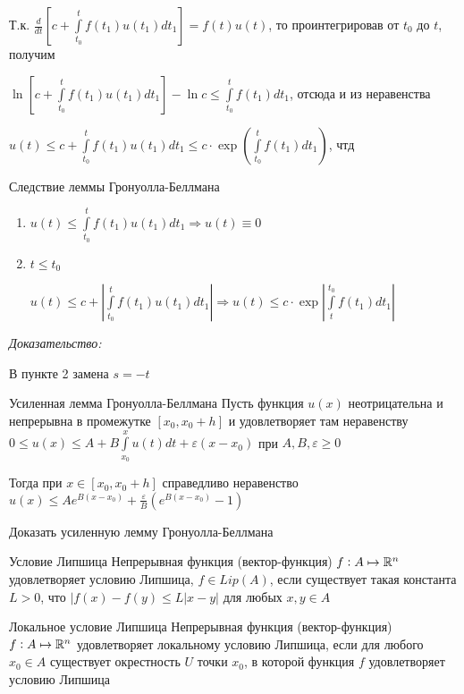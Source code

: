 \documentclass[12pt]{article}
\begin{document}
Т.к. $\frac{d}{dt}\left[ c + \int\limits_{t_0}^t f(t_1) u(t_1)dt_1 \right] = f(t)u(t)$, то проинтегрировав от $t_0$ до $t$, получим 

$\ln\left[ c + \int\limits_{t_0}^t f(t_1)u(t_1)dt_1 \right] - \ln c \leq \int\limits_{t_0}^t f(t_1)dt_1$, отсюда и из неравенства 

$u(t) \leq c + \int\limits_{t_0}^t f(t_1)u(t_1)dt_1 \leq c \cdot \exp(\int\limits_{t_0}^t f(t_1)dt_1)$, чтд

\begin{theo}{Следствие леммы Гронуолла-Беллмана}
    \begin{enumerate}
        \item $u(t) \leq \int\limits_{t_0}^t f(t_1)u(t_1)dt_1 \Rightarrow u(t) \equiv 0$
        \item $t \leq t_0$
        
        $u(t) \leq c + \left| \int\limits_{t_0}^t f(t_1)u(t_1)dt_1 \right| \Rightarrow u(t) \leq c \cdot \exp\left| \int\limits_t^{t_0} f(t_1)dt_1 \right|$
    \end{enumerate}
\end{theo}

\textit{Доказательство:}

В пункте 2 замена $s = -t$ 

\begin{lem}{Усиленная лемма Гронуолла-Беллмана}
    Пусть функция $u(x)$ неотрицательна и непрерывна в промежутке $[x_0, x_0 + h]$ и удовлетворяет там неравенству $0 \leq u(x) \leq A + B \int\limits_{x_0}^x u(t)dt + \varepsilon(x - x_0)$ при $A, B, \varepsilon \geq 0$

    Тогда при $x \in [x_0, x_0 + h]$ справедливо неравенство $u(x) \leq Ae^{B(x - x_0)} + \frac{\varepsilon}{B}(e^{B(x - x_0)} - 1)$
\end{lem}

\begin{Exercise}{}
    Доказать усиленную лемму Гронуолла-Беллмана
\end{Exercise}

\begin{defin}{Условие Липшица}
    Непрерывная функция (вектор-функция) $f : A \mapsto \mathbb R^n$ удовлетворяет условию Липшица, $f \in Lip(A)$, если существует такая константа $L > 0$, что $|f(x) - f(y) \leq L|x - y|$ для любых $x, y \in A$
\end{defin}

\begin{defin}{Локальное условие Липшица}
    Непрерывная функция (вектор-функция) $f : A \mapsto \mathbb R^n$ удовлетворяет локальному условию Липшица, если для любого $x_0 \in A$ существует окрестность $U$ точки $x_0$, в которой функция $f$ удовлетворяет условию Липшица
\end{defin}
\end{document}
